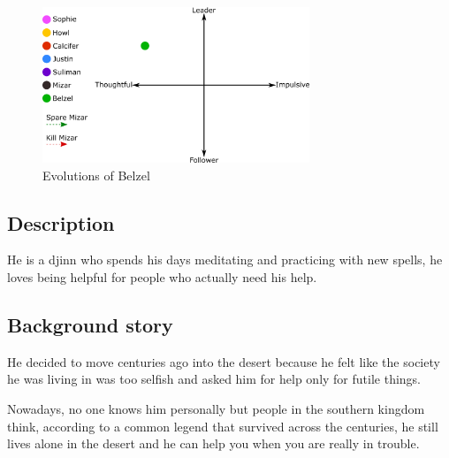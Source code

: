 \begin{figure}
   \centering
   \includegraphics[width=8cm]{Images/Evolutions/belzelEvolution}
   \caption{Evolutions of Belzel}
\end{figure}

\subsection{Description}
He is a djinn who spends his days meditating and practicing with new spells, he loves being helpful for people who actually need his help. 

\subsection{Background story}
He decided to move centuries ago into the desert because he felt like the society he was living in was too selfish and asked him for help only for futile things.

Nowadays, no one knows him personally but people in the southern kingdom think, according to a common legend that survived across the centuries, he still lives alone in the desert and he can help you when you are really in trouble.
